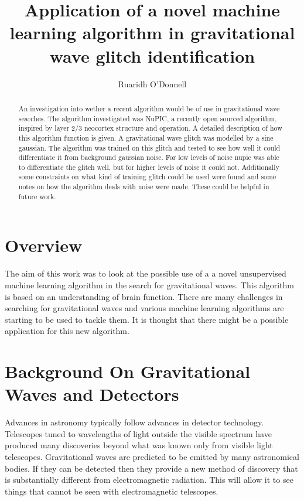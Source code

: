 \documentclass[a4paper]{jpconf}
\begin{document}
\title{Application of a novel machine learning algorithm in gravitational wave glitch identification}

\author{Ruaridh O'Donnell}


\begin{abstract}
    An investigation into wether a recent algorithm would be of use in gravitational wave searches. The algorithm investigated was NuPIC, a recently open sourced algorithm, inspired by layer 2/3 neocortex structure and operation. A detailed description of how this algorithm function is given. A gravitational wave glitch was modelled by a sine gaussian. The algorithm was trained on this glitch and tested to see how well it could differentiate it from background gaussian noise. For low levels of noise nupic was able to differentiate the glitch well, but for higher levels of noise it could not. Additionally some constraints on what kind of training glitch could be used were found and some notes on how the algorithm deals with noise were made. These could be helpful in future work.
    
\end{abstract}

\section{Overview}%
    The aim of this work was to look at the possible use of a a novel unsupervised machine learning algorithm in the search for gravitational waves. This algorithm is based on an understanding of brain function. There are many challenges in searching for gravitational waves and various machine learning algorithms are starting to be used to tackle them. It is thought that there might be a possible application for this new algorithm.

\section{Background On Gravitational Waves and Detectors}\label{aargh}%
Advances in astronomy typically follow advances in detector technology. Telescopes tuned to wavelengths of light outside the visible spectrum have produced many discoveries beyond what was known only from visible light telescopes. Gravitational waves are predicted to be emitted by many astronomical bodies. If they can be detected then they provide a new method of discovery that is substantially different from electromagnetic radiation. This will allow it to see things that cannot be seen with electromagnetic telescopes.
\end{document}
